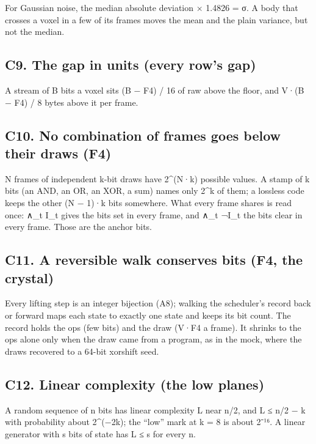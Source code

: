 For Gaussian noise, the median absolute deviation × 1.4826 = σ. A body that crosses a voxel in a few of its frames moves the mean and the plain variance, but not the median.

\subsection{\texorpdfstring{C9. The gap in units (every row's gap)}{C9. The gap in units (every row's gap)}}

A stream of B bits a voxel sits (B − F4) / 16 of raw above the floor, and V·(B − F4) / 8 bytes above it per frame.

\subsection{\texorpdfstring{C10. No combination of frames goes below their draws (F4)}{C10. No combination of frames goes below their draws (F4)}}

N frames of independent k-bit draws have 2\textasciicircum{}(N·k) possible values. A stamp of k bits (an AND, an OR, an XOR, a sum) names only 2\textasciicircum{}k of them; a lossless code keeps the other (N − 1)·k bits somewhere. What every frame shares is read once: ∧\_\allowbreak{}t I\_\allowbreak{}t gives the bits set in every frame, and ∧\_\allowbreak{}t ¬I\_\allowbreak{}t the bits clear in every frame. Those are the anchor bits.

\subsection{\texorpdfstring{C11. A reversible walk conserves bits (F4, the crystal)}{C11. A reversible walk conserves bits (F4, the crystal)}}

Every lifting step is an integer bijection (A8); walking the scheduler's record back or forward maps each state to exactly one state and keeps its bit count. The record holds the ops (few bits) and the draw (V·F4 a frame). It shrinks to the ops alone only when the draw came from a program, as in the mock, where the draws recovered to a 64-bit xorshift seed.

\subsection{\texorpdfstring{C12. Linear complexity (the low planes)}{C12. Linear complexity (the low planes)}}

A random sequence of n bits has linear complexity L near n/2, and L ≤ n/2 − k with probability about 2\textasciicircum{}(−2k); the “low” mark at k = 8 is about 2⁻¹⁶. A linear generator with s bits of state has L ≤ s for every n.

